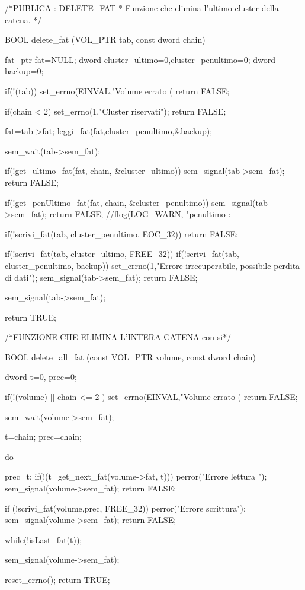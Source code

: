 /*PUBLICA : DELETE_FAT 
 * Funzione che elimina l'ultimo cluster della catena. 
 */ 

BOOL delete_fat (VOL_PTR tab, const dword chain) { 
  

  fat_ptr fat=NULL; 
  dword cluster_ultimo=0,cluster_penultimo=0; 
  dword backup=0; 
  
  if(!(tab)) {
    set_errno(EINVAL,"Volume errato (%
    return FALSE; 
  }
  
  if(chain < 2) {
    set_errno(1,"Cluster riservati");
    return FALSE; 
  }
    
    
  fat=tab->fat; 
  leggi_fat(fat,cluster_penultimo,&backup);
  
  
  sem_wait(tab->sem_fat); 
  
  if(!get_ultimo_fat(fat, chain, &cluster_ultimo)) {
    sem_signal(tab->sem_fat);
    return FALSE; 
  }
  
  if(!get_penUltimo_fat(fat, chain, &cluster_penultimo)) {
    sem_signal(tab->sem_fat);
    return FALSE;   
  }
  //flog(LOG_WARN, "penultimo : %
  
  if(!scrivi_fat(tab, cluster_penultimo, EOC_32)) 
    return FALSE; 

  
  if(!scrivi_fat(tab, cluster_ultimo, FREE_32)) {
    if(!scrivi_fat(tab, cluster_penultimo,  backup)) 
      set_errno(1,"Errore irrecuperabile, possibile perdita di dati");    
    sem_signal(tab->sem_fat);
    return FALSE; 
  }
  
  sem_signal(tab->sem_fat); 
  
  return TRUE;
 
}


/*FUNZIONE CHE ELIMINA L'INTERA CATENA con si*/


BOOL delete_all_fat (const VOL_PTR volume, const dword chain) { 
  
  dword t=0, prec=0; 
  
  
  if(!(volume) || chain <= 2 ) {
    set_errno(EINVAL,"Volume errato (%
    return FALSE; 
  }
  
  sem_wait(volume->sem_fat); 
  
  t=chain; 
  prec=chain; 
  
    do {
	prec=t; 
	if(!(t=get_next_fat(volume->fat, t))) {
	  perror("Errore lettura ");
	  sem_signal(volume->sem_fat); 
	  return FALSE; 
	}
	
	if (!scrivi_fat(volume,prec, FREE_32)) {
	  perror("Errore scrittura");
	  sem_signal(volume->sem_fat); 
	  return FALSE;  
	}
    } while(!isLast_fat(t)); 
    
   sem_signal(volume->sem_fat); 
  
    
  reset_errno(); 
  return TRUE; 
  
}

